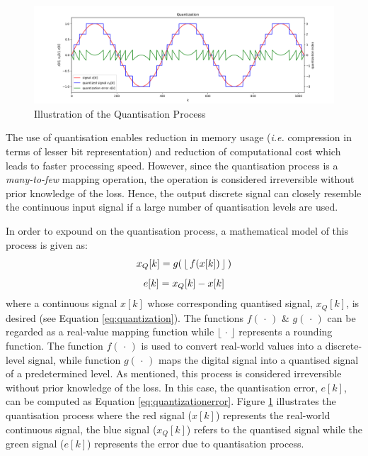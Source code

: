 \begin{figure}[hbt!]
 \centering
 \includegraphics[width=\textwidth]{image/general/quantization.png}
 \caption{Illustration of the Quantisation Process}
 \label{fig:quantize}
\end{figure}

The use of quantisation enables reduction in memory usage (\emph{i.e.} compression in terms of lesser bit representation) and
reduction of computational cost which leads to faster processing speed.
However, since the quantisation process is a \emph{many-to-few} mapping
operation, the operation is considered irreversible without prior knowledge of
the loss. Hence, the output discrete signal can closely resemble the continuous input signal if a large number of quantisation levels are used.

In order to expound on the quantisation process, a mathematical model of this
process is given as:
\begin{equation}
 \centering
 \label{eq:quantization}
 x_Q[k] = g(\mspace{3mu}\lfloor \mspace{3mu}f(x[k]) \mspace{3mu}\rfloor\mspace{3mu})
\end{equation}
\vspace{-3em}
\begin{equation}
 \centering
 \label{eq:quantizationerror}
 e[k] = x_Q[k] - x[k]
\end{equation}
where a continuous signal $x[k]$ whose
corresponding quantised signal, $x_Q[k]$, is desired (see Equation \ref{eq:quantization}). The
functions $f (\mspace{3mu} \cdot \mspace{3mu})$ \& $g (\mspace{3mu} \cdot\mspace{3mu})$
can be regarded as a real-value mapping function while $\lfloor \mspace{3mu} \cdot
\mspace{3mu} \rfloor$ represents a rounding function. The function $
f(\mspace{3mu} \cdot \mspace{3mu})$ is used to
convert real-world values into a discrete-level signal, while function
$g (\mspace{3mu} \cdot\mspace{3mu})$ maps the digital signal into a
quantised signal of a predetermined level. As mentioned, this process is considered irreversible without
prior knowledge of the loss. In this case, the quantisation error, $e[k]$, can be
computed as Equation \ref{eq:quantizationerror}. Figure \ref{fig:quantize}
illustrates the quantisation process where the red signal ($x[k]$) represents
the real-world continuous signal, the blue signal ($x_Q[k]$) refers to the
quantised signal while the green signal ($e[k]$) represents the error due to
quantisation process.

